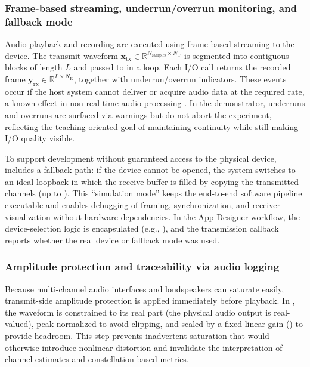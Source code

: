 \subsubsection{Frame-based streaming, underrun/overrun monitoring, and fallback mode}
\label{sec:streaming}

Audio playback and recording are executed using frame-based streaming to the device. The transmit waveform
$\mathbf{x}_{\mathrm{tx}} \in \mathbb{R}^{N_{\mathrm{samples}} \times N_{\mathrm{T}}}$
is segmented into contiguous blocks of length $L$ and passed to  in a loop. Each I/O call returns the recorded frame
$\mathbf{y}_{\mathrm{rx}} \in \mathbb{R}^{L \times N_{\mathrm{R}}}$,
together with underrun/overrun indicators. These events occur if the host system cannot deliver or acquire audio data at the required rate, a known effect in non-real-time audio processing \cite{mathworks_apr,mathworks_audio_buffering}. In the demonstrator, underruns and overruns are surfaced via warnings but do not abort the experiment, reflecting the teaching-oriented goal of maintaining continuity while still making I/O quality visible.

To support development without guaranteed access to the physical device,  includes a fallback path: if the device cannot be opened, the system switches to an ideal loopback in which the receive buffer is filled by copying the transmitted channels (up to ). This ``simulation mode'' keeps the end-to-end software pipeline executable and enables debugging of framing, synchronization, and receiver visualization without hardware dependencies. In the App Designer workflow, the device-selection logic is encapsulated (e.g., ), and the transmission callback reports whether the real device or fallback mode was used.

\subsubsection{Amplitude protection and traceability via audio logging}
\label{sec:amplitude_logging}

Because multi-channel audio interfaces and loudspeakers can saturate easily, transmit-side amplitude protection is applied immediately before playback. In , the waveform is constrained to its real part (the physical audio output is real-valued), peak-normalized to avoid clipping, and scaled by a fixed linear gain () to provide headroom. This step prevents inadvertent saturation that would otherwise introduce nonlinear distortion and invalidate the interpretation of channel estimates and constellation-based metrics.

